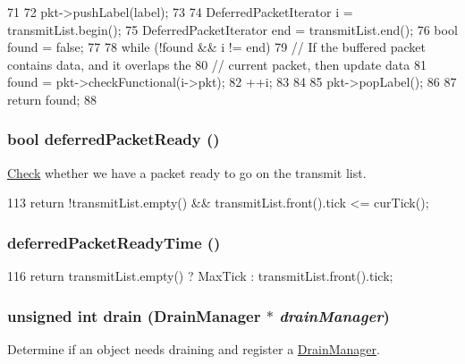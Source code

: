 \begin{DoxyCode}
71 {
72     pkt->pushLabel(label);
73 
74     DeferredPacketIterator i = transmitList.begin();
75     DeferredPacketIterator end = transmitList.end();
76     bool found = false;
77 
78     while (!found && i != end) {
79         // If the buffered packet contains data, and it overlaps the
80         // current packet, then update data
81         found = pkt->checkFunctional(i->pkt);
82         ++i;
83     }
84 
85     pkt->popLabel();
86 
87     return found;
88 }
\end{DoxyCode}
\hypertarget{classPacketQueue_a052ea90ae061f6d3b53d6dee3b3076f3}{
\subsubsection[{deferredPacketReady}]{\setlength{\rightskip}{0pt plus 5cm}bool deferredPacketReady ()}}
\label{classPacketQueue_a052ea90ae061f6d3b53d6dee3b3076f3}
\hyperlink{classCheck}{Check} whether we have a packet ready to go on the transmit list. 


\begin{DoxyCode}
113     { return !transmitList.empty() && transmitList.front().tick <= curTick(); }
\end{DoxyCode}
\hypertarget{classPacketQueue_a9a43740cba452beb76e08a890f59c70d}{
\subsubsection[{deferredPacketReadyTime}]{ deferredPacketReadyTime ()}}
\label{classPacketQueue_a9a43740cba452beb76e08a890f59c70d}



\begin{DoxyCode}
116     { return transmitList.empty() ? MaxTick : transmitList.front().tick; }
\end{DoxyCode}
\hypertarget{classPacketQueue_aa8a18d230dba7a674ac8a0b4f35bc36a}{
\subsubsection[{drain}]{\setlength{\rightskip}{0pt plus 5cm}unsigned int drain ({\bf DrainManager} $\ast$ {\em drainManager})}}
\label{classPacketQueue_aa8a18d230dba7a674ac8a0b4f35bc36a}
Determine if an object needs draining and register a \hyperlink{classDrainManager}{DrainManager}.

